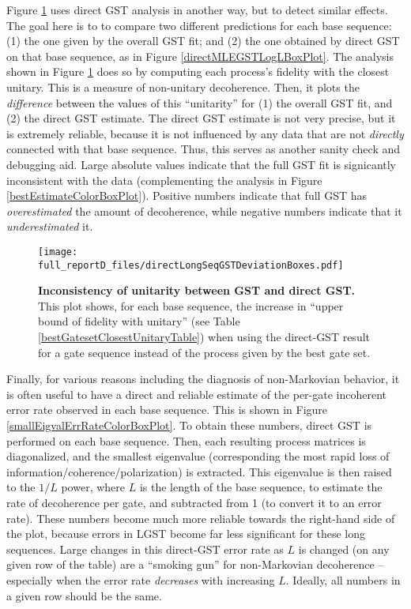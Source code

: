 {Figure \ref{directMLEGSTDeviationBoxPlot} uses direct GST analysis in another way, but to detect similar effects.   The goal here is to to compare two different predictions for each base sequence:  (1) the one given by the overall GST fit; and (2) the one obtained by direct GST on that base sequence, as in Figure \ref{directMLEGSTLogLBoxPlot}.  The analysis shown in Figure \ref{directMLEGSTDeviationBoxPlot} does so by computing each process's fidelity with the closest unitary.  This is a measure of non-unitary decoherence.  Then, it plots the \emph{difference} between the values of this ``unitarity'' for (1) the overall GST fit, and (2) the direct GST estimate.  The direct GST estimate is not very precise, but it is extremely reliable, because it is not influenced by any data that are not \emph{directly} connected with that base sequence.  Thus, this serves as another sanity check and debugging aid.  Large absolute values indicate that the full GST fit is signicantly inconsistent with the data (complementing the analysis in Figure \ref{bestEstimateColorBoxPlot}).  Positive numbers indicate that full GST has \emph{overestimated} the amount of decoherence, while negative numbers indicate that it \emph{underestimated} it.

\begin{figure}
\begin{center}
\texttt{[image: full\_reportD\_files/directLongSeqGSTDeviationBoxes.pdf]}
\caption{\textbf{Inconsistency of unitarity between GST and direct GST.}  This plot shows, for each base sequence, the increase in ``upper bound of fidelity with unitary'' (see Table \ref{bestGatesetClosestUnitaryTable}) when using the direct-GST result for a gate sequence instead of the process given by the best gate set.\label{directMLEGSTDeviationBoxPlot}}
\end{center}
\end{figure}

Finally, for various reasons including the diagnosis of non-Markovian behavior, it is often useful to have a direct and reliable estimate of the per-gate incoherent error rate observed in each base sequence.  This is shown in Figure \ref{smallEigvalErrRateColorBoxPlot}.  To obtain these numbers, direct GST is performed on each base sequence.  Then, each resulting process matrices is diagonalized, and the smallest eigenvalue (corresponding the most rapid loss of information/coherence/polarization) is extracted.  This eigenvalue is then raised to the $1/L$ power, where $L$ is the length of the base sequence, to estimate the rate of decoherence per gate, and subtracted from 1 (to convert it to an error rate).  These numbers become much more reliable towards the right-hand side of the plot, because errors in LGST become far less significant for these long sequences.  Large changes in this direct-GST error rate as $L$ is changed (on any given row of the table) are a ``smoking gun'' for non-Markovian decoherence -- especially when the error rate \emph{decreases} with increasing $L$.  Ideally, all numbers in a given row should be the same.

}
